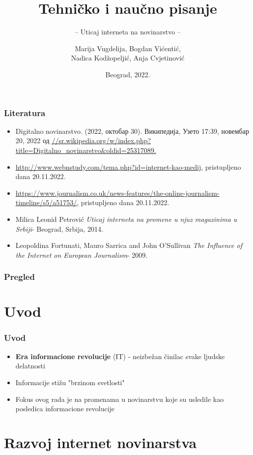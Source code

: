 \documentclass{beamer}
\title{Tehničko i naučno pisanje}
\subtitle{-- Uticaj interneta na novinarstvo --}
\author{Marija Vugdelija, Bogdan Vićentić,\\ Nadica Kodžopeljić, Anja Cvjetinović}
\institute{Matematički fakultet\\Univerzitet u Beogradu}
\date{
	\footnotesize{Beograd, 2022.}	
}
\begin{document}
\begin{frame}
	\thispagestyle{empty}
	\titlepage
\end{frame}

\addtocounter{framenumber}{-1}

\begin{frame}[fragile]\frametitle{Literatura}
\transboxin
	\begin{itemize}	
		\item {Digitalno novinarstvo. (2022, октобар 30). Википедија, Узето 17:39, новембар 20, 2022 од \url{//sr.wikipedia.org/w/index.php?title=Digitalno_novinarstvo&oldid=25317089.}}
        \item \url{http://www.webnstudy.com/tema.php?id=internet-kao-medij}, pristupljeno dana 20.11.2022.
        \item \url{https://www.journalism.co.uk/news-features/the-online-journalism-timeline/s5/a51753/}, pristupljeno dana 20.11.2022.
        \item Milica Leonid Petrović \emph{Uticaj interneta na promene u njuz magazinima u Srbiji}- Beograd, Srbija, 2014.
        \item Leopoldina Fortunati, Mauro Sarrica and John O'Sullivan \emph{The Influence of the Internet on European Journalism}- 2009.
	\end{itemize}
\end{frame}

\begin{frame}
	\frametitle{Pregled} 
    \transboxin
	\tableofcontents[hidesubsections] 
\end{frame}

\section{Uvod}

\begin{frame}[fragile]\frametitle{Uvod}
\transboxin
	\begin{itemize}	
		\item {\bf Era informacione revolucije} (IT) - neizbežan činilac svake ljudske delatnosti
            \item Informacije stižu "brzinom svetlosti"
            \item Fokus ovog rada je na promenama u novinarstvu koje su usledile kao posledica informacione revolucije
	\end{itemize}
\end{frame}

\section{Razvoj internet novinarstva}
\end{document}
